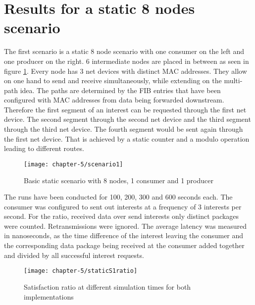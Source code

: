 \section{Results for a static 8 nodes scenario}

The first scenario is a static 8 node scenario with one consumer on the left and one producer on the right. 6 intermediate nodes are placed in between as seen in figure \ref{fig:scenario1}. Every node has 3 net devices with distinct MAC addresses. They allow on one hand to send and receive simultaneously, while extending on the multi-path idea. The paths are determined by the FIB entries that have been configured with MAC addresses from data being forwarded downstream. Therefore the first segment of an interest can be requested through the first net device. The second segment through the second net device and the third segment through the third net device. The fourth segment would be sent again through the first net device. That is achieved by a static counter and a modulo operation leading to different routes.

\vspace{5mm} %

\begin{figure}[H]
  \centering
  \texttt{[image: chapter-5/scenario1]}
  \caption{Basic static scenario with 8 nodes, 1 consumer and 1 producer}
  \label{fig:scenario1}
\end{figure}

\vspace{5mm} %

The runs have been conducted for 100, 200, 300 and 600 seconds each. The consumer was configured to sent out interests at a frequency of 3 interests per second. For the ratio, received data over send interests only distinct packages were counted. Retransmissions were ignored. The average latency was measured in nanoseconds, as the time difference of the interest leaving the consumer and the corresponding data package being received at the consumer added together and divided by all successful interest requests.

\vspace{5mm} %

\begin{figure}[H]
  \centering
  \texttt{[image: chapter-5/staticS1ratio]}
  \caption{Satisfaction ratio at different simulation times for both implementations}
  \label{fig:staticS1ratio}
\end{figure}

